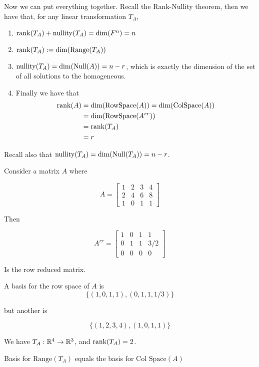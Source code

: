 \documentclass[12pt]{article}
\def\range{\text{Range}}
\def\RowSpace{\text{RowSpace}}
\def\ColSpace{\text{ColSpace}}
\begin{document}
  Now we can put everything together. Recall the Rank-Nullity theorem, then we
  have that, for any linear transformation $T_A$,

  \begin{enumerate}
    \item $\mathrm{rank}(T_A) + \mathrm{nullity}(T_A) = \dim(F^n) = n$
    \item $\rank(T_A) := \dim(\range(T_A))$
    \item $\mathrm{nullity}(T_A) = \dim(\mathrm{Null}(A)) = n - r$, which is exactly the dimension of
      the set of all solutions to the homogeneous.
    \item Finally we have that
      \begin{align*}
        \rank(A) &= \dim(\RowSpace(A)) = \dim(\ColSpace(A)) \\
                 &= \dim(\RowSpace(A^{rr})) \\
                 &= \rank(T_A) \\
                 &= r
      \end{align*}
  \end{enumerate}

  Recall also that $\mathrm{nullity}(T_A) = \dim(\mathrm{Null}(T_A)) = n - r$.

  Consider a matrix $A$ where

  \[
    A = \begin{bmatrix}
      1 & 2 & 3 & 4 \\
      2 & 4 & 6 & 8 \\
      1 & 0 & 1 & 1
    \end{bmatrix}
  \]

  Then

  \[
    A^{rr} = \begin{bmatrix}
      1 & 0 & 1 & 1 \\
      0 & 1 & 1 & 3/2 \\
      0 & 0 & 0 & 0
    \end{bmatrix}
  \]

  Is the row reduced matrix.

  A basis for the row space of $A$ is
  \[
    \{(1, 0, 1, 1), (0, 1, 1, 1/3)\}
  \]

  but another is

  \[
    \{(1, 2, 3, 4), (1, 0, 1, 1)\}
  \]

  We have $T_A: {\mathbb R}^4 \to {\mathbb R}^3$, and $\mathrm{rank}(T_A) = 2$.

  Basis for $\range(T_A)$ equals the basis for $\text{Col Space}(A)$

\end{document}
